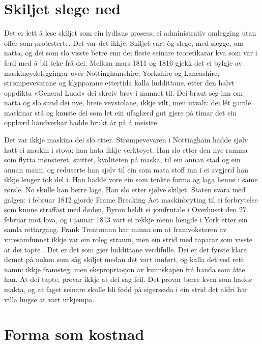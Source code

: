 \section{Skiljet slege ned}

Det er lett å lese skiljet som ein lydlaus prosess, ei administrativ omlegging utan offer som protesterte. Det var det ikkje. Skiljet vart òg slege, med slegge, om natta, og dei som slo visste betre enn dei fleste seinare teoretikarar kva som var i ferd med å bli teke frå dei. Mellom mars 1811 og 1816 gjekk det ei bylgje av maskinøydeleggingar over Nottinghamshire, Yorkshire og Lancashire, strømpevevarane og klypparane ettertida kalla luddittane, etter den halvt oppdikta «General Ludd» dei skreiv brev i namnet til. Dei braut seg inn om natta og slo sund dei nye, breie vevstolane, ikkje vilt, men utvalt: dei lét gamle maskinar stå og knuste dei som let ein ufaglærd gut gjere på timar det ein opplærd handverkar hadde brukt år på å meistre.

Det var ikkje maskina dei slo etter. Strømpevevaren i Nottingham hadde sjølv hatt ei maskin i stova; han hata ikkje verktøyet. Han slo etter den nye ramma som flytta mønsteret, snittet, kvaliteten på maska, til ein annan stad og ein annan mann, og reduserte han sjølv til ein som mata stoff inn i ei avgjerd han ikkje lenger tok del i. Han hadde vore ein som tenkte forma og laga henne i same rørsle. No skulle han berre lage. Han slo etter sjølve skiljet. Staten svara med galgen: i februar 1812 gjorde Frame Breaking Act maskinbryting til ei forbrytelse som kunne straffast med døden, Byron heldt si jomfrutale i Overhuset den 27. februar mot lova, og i januar 1813 vart ei rekkje menn hengde i York etter ein samla rettargang. Frank Trentmann har minna om at framvoksteren av varesamfunnet ikkje var ein roleg straum, men ein strid med taparar som visste at dei tapte \autocite{trentmann2016}. Det er det som gjer luddittane verdifulle. Dei er det fyrste klare dømet på nokon som såg skiljet medan det vart innført, og kalla det ved rett namn: ikkje framsteg, men ekspropriasjon av kunnskapen frå handa som åtte han. At dei tapte, provar ikkje at dei såg feil. Det provar berre kven som hadde makta, og at faget seinare skulle bli fødd på sigerssida i ein strid det aldri har villa hugse at vart utkjempa.

\section{Forma som kostnad}

